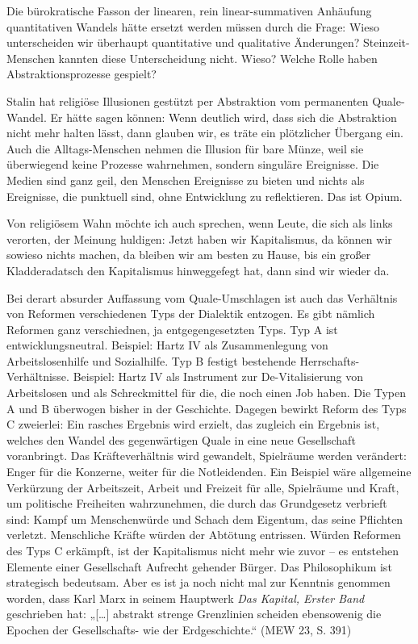 \documentclass[11pt,a4paper]{article}
\begin{document}
Die bürokratische Fasson der linearen, rein linear-summativen Anhäufung
quantitativen Wandels hätte ersetzt werden müssen durch die Frage: Wieso
unterscheiden wir überhaupt quantitative und qualitative Änderungen?
Steinzeit-Menschen kannten diese Unterscheidung nicht. Wieso? Welche Rolle
haben Abstraktionsprozesse gespielt?

Stalin hat religiöse Illusionen gestützt per Abstraktion vom permanenten
Quale-Wandel. Er hätte sagen können: Wenn deutlich wird, dass sich die
Abstraktion nicht mehr halten lässt, dann glauben wir, es träte ein
plötzlicher Übergang ein. Auch die Alltags-Menschen nehmen die Illusion für
bare Münze, weil sie überwiegend keine Prozesse wahrnehmen, sondern singuläre
Ereignisse. Die Medien sind ganz geil, den Menschen Ereignisse zu bieten und
nichts als Ereignisse, die punktuell sind, ohne Entwicklung zu reflektieren.
Das ist Opium.

Von religiösem Wahn möchte ich auch sprechen, wenn Leute, die sich als links
verorten, der Meinung huldigen: Jetzt haben wir Kapitalismus, da können wir
sowieso nichts machen, da bleiben wir am besten zu Hause, bis ein großer
Kladderadatsch den Kapitalismus hinweggefegt hat, dann sind wir wieder da.

Bei derart absurder Auffassung vom Quale-Umschlagen ist auch das Verhältnis
von Reformen verschiedenen Typs der Dialektik entzogen. Es gibt nämlich
Reformen ganz verschiednen, ja entgegengesetzten Typs. Typ A ist
entwicklungsneutral. Beispiel: Hartz IV als Zusammenlegung von
Arbeitslosenhilfe und Sozialhilfe. Typ B festigt bestehende
Herrschafts-Verhältnisse. Beispiel: Hartz IV als Instrument zur
De-Vitalisierung von Arbeitslosen und als Schreckmittel für die, die noch
einen Job haben. Die Typen A und B überwogen bisher in der Geschichte. Dagegen
bewirkt Reform des Typs C zweierlei: Ein rasches Ergebnis wird erzielt, das
zugleich ein Ergebnis ist, welches den Wandel des gegenwärtigen Quale in eine
neue Gesellschaft voranbringt. Das Kräfteverhältnis wird gewandelt, Spielräume
werden verändert: Enger für die Konzerne, weiter für die Notleidenden. Ein
Beispiel wäre allgemeine Verkürzung der Arbeitszeit, Arbeit und Freizeit für
alle, Spielräume und Kraft, um politische Freiheiten wahrzunehmen, die durch
das Grundgesetz verbrieft sind: Kampf um Menschenwürde und Schach dem
Eigentum, das seine Pflichten verletzt. Menschliche Kräfte würden der Abtötung
entrissen. Würden Reformen des Typs C erkämpft, ist der Kapitalismus nicht
mehr wie zuvor -- es entstehen Elemente einer Gesellschaft Aufrecht gehender
Bürger. Das Philosophikum ist strategisch bedeutsam. Aber es ist ja noch nicht
mal zur Kenntnis genommen worden, dass Karl Marx in seinem Hauptwerk \emph{Das
  Kapital, Erster Band} geschrieben hat: „[\ldots] abstrakt strenge
Grenzlinien scheiden ebensowenig die Epochen der Gesellschafts- wie der
Erdgeschichte.“ (MEW 23, S. 391)
\end{document}
